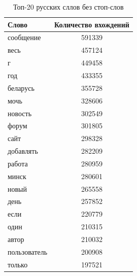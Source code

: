 \begin{table}
	\begin{center}
		\begin{tabular}{|l|c|}
			\hline
			Слово & Количество вхождений\\
			\hline
			сообщение& 591339 \\
			весь &457124 \\
			г &449458\\
			год& 433355\\
			беларусь &355728\\
			мочь &328606\\
			новость& 302549\\
			форум &301805\\
			сайт &298328\\
			добавлять &282209\\
			работа &280959\\
			минск &280601\\
			новый &265558\\
			день &257852\\
			если &220779\\
			один &210315\\
			автор &210032\\
			пользователь &200908\\
			только &197521\\
			\hline
		\end{tabular}
	\end{center}
	\caption{Топ-20 русских сллов без стоп-слов}
	\label{table_russian_words}
\end{table}

